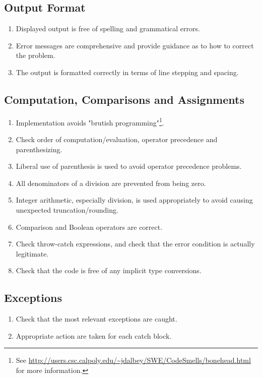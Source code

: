 \documentclass{article}
\begin{document}
\subsection*{Output Format}\begin{enumerate}[resume]
\item Displayed output is free of spelling and grammatical errors.
\item Error messages are comprehensive and provide guidance as to how to correct the problem.
\item The output is formatted correctly in terms of line stepping and spacing.
\end{enumerate}

\subsection*{Computation, Comparisons and Assignments}\begin{enumerate}[resume]
\item Implementation avoids "brutish programming"\footnote{See \url{http://users.csc.calpoly.edu/~jdalbey/SWE/CodeSmells/bonehead.html} for more information.}. 
\item Check order of computation/evaluation, operator precedence and parenthesizing.
\item Liberal use of parenthesis is used to avoid operator precedence problems.
\item All denominators of a division are prevented from being zero.
\item Integer arithmetic, especially division, is used appropriately to avoid causing unexpected truncation/rounding.
\item Comparison and Boolean operators are correct.
\item Check throw-catch expressions, and check that the error condition is actually legitimate.
\item Check that the code is free of any implicit type conversions.
\end{enumerate}

\subsection*{Exceptions}\begin{enumerate}[resume]
\item Check that the most relevant exceptions are caught.
\item Appropriate action are taken for each catch block.
\end{enumerate}
\end{document}
